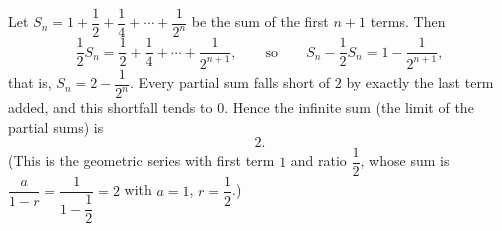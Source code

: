 Let $S_n=1+\dfrac{1}{2}+\dfrac{1}{4}+\cdots+\dfrac{1}{2^{n}}$ be the sum of the first $n+1$ terms. Then
\[
\dfrac{1}{2}S_n=\dfrac{1}{2}+\dfrac{1}{4}+\cdots+\dfrac{1}{2^{n+1}},\qquad\text{so}\qquad S_n-\dfrac{1}{2}S_n=1-\dfrac{1}{2^{n+1}},
\]
that is, $S_n=2-\dfrac{1}{2^{n}}$. Every partial sum falls short of $2$ by exactly the last term added, and this shortfall tends to $0$. Hence the infinite sum (the limit of the partial sums) is
\[
\boxed{2}.
\]
(This is the geometric series with first term $1$ and ratio $\dfrac{1}{2}$, whose sum is $\dfrac{a}{1-r}=\dfrac{1}{1-\dfrac{1}{2}}=2$ with $a=1$, $r=\dfrac{1}{2}$.)
